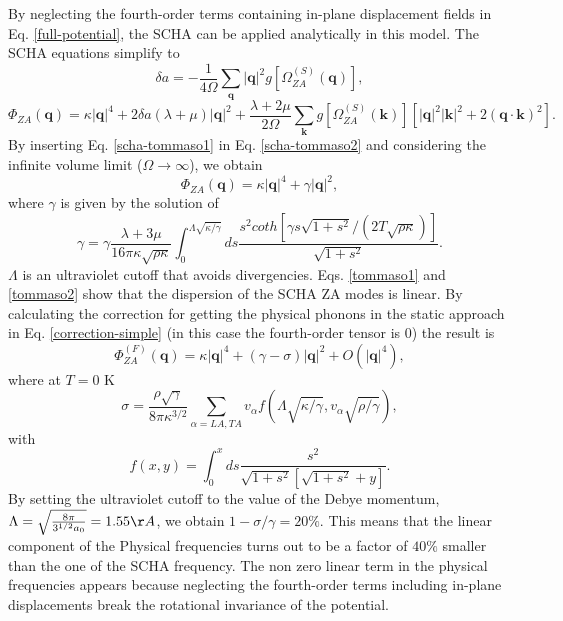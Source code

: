 By neglecting the fourth-order terms containing in-plane displacement fields in Eq. \ref{full-potential}, the SCHA 
can be applied analytically in this model. The SCHA equations simplify to
\begin{equation}
\label{scha-tommaso1}
\delta a=-\frac{1}{4\Omega}\sum_{\boldsymbol{q}}|\boldsymbol{q}|^{2}g[\Omega_{ZA}^{(S)}(\boldsymbol{q})],
\end{equation}
\begin{equation}
\label{scha-tommaso2}
\Phi_{ZA}(\boldsymbol{q})=\kappa|\boldsymbol{q}|^{4}+2\delta a(\lambda+\mu)|\boldsymbol{q}|^{2}+\frac{\lambda+2\mu}{2\Omega}\sum_{\boldsymbol{k}}g[\Omega_{ZA}^{(S)}(\boldsymbol{k})][|\boldsymbol{q}|^{2}|\boldsymbol{k}|^{2}+2(\boldsymbol{q}\cdot\boldsymbol{k})^{2}].
\end{equation}
By inserting Eq. \ref{scha-tommaso1} in Eq. \ref{scha-tommaso2} and considering the infinite volume limit 
($\Omega\rightarrow\infty$), we obtain
\begin{equation}
\label{tommaso1}
\Phi_{ZA}(\boldsymbol{q})=\kappa|\boldsymbol{q}|^{4}+\gamma|\boldsymbol{q}|^{2},
\end{equation}
where $\gamma$ is given by the solution of
\begin{equation}
\label{tommaso2}
\gamma=\gamma\frac{\lambda+3\mu}{16\pi\kappa\sqrt{\rho\kappa}}\int_{0}^{\Lambda\sqrt{\kappa/\gamma}}ds\frac{s^{2}coth[\gamma s\sqrt{1+s^{2}}/(2T\sqrt{\rho\kappa})]}{\sqrt{1+s^{2}}}.
\end{equation}
$\Lambda$ is an ultraviolet cutoff that avoids divergencies.
Eqs. \ref{tommaso1} and \ref{tommaso2} show that the dispersion of the SCHA ZA modes is linear. By calculating the 
correction for getting the physical phonons in the static approach in Eq. \ref{correction-simple} (in this case the 
fourth-order tensor is $0$) the result is
\begin{equation}
\Phi_{ZA}^{(F)}(\boldsymbol{q})=\kappa|\boldsymbol{q}|^{4}+(\gamma-\sigma)|\boldsymbol{q}|^{2}+O(|\boldsymbol{q}|^{4}),
\end{equation}
where at $T=0$ K
\begin{equation}
\sigma=\frac{\rho\sqrt{\gamma}}{8\pi\kappa^{3/2}}\sum_{\alpha=LA,TA}v_{\alpha}f(\Lambda\sqrt{\kappa/\gamma},v_{\alpha}\sqrt{\rho/\gamma}),
\end{equation}
with
\begin{equation}
f(x,y)=\int_{0}^{x}ds\frac{s^{2}}{\sqrt{1+s^{2}}[\sqrt{1+s^{2}}+y]}.
\end{equation}
By setting the ultraviolet cutoff to the value of the Debye momentum, 
$\Lambda=\sqrt{\frac{8\pi}{3^{1/2}a_{0}}}=1.55\AA$, we obtain $1-\sigma/\gamma=20\%$. This means that the linear 
component of the Physical frequencies turns out to be a factor of $40\%$ smaller than the one of the SCHA frequency. 
The non zero linear term in the physical frequencies appears because neglecting the fourth-order terms including 
in-plane displacements break the rotational invariance of the potential.
